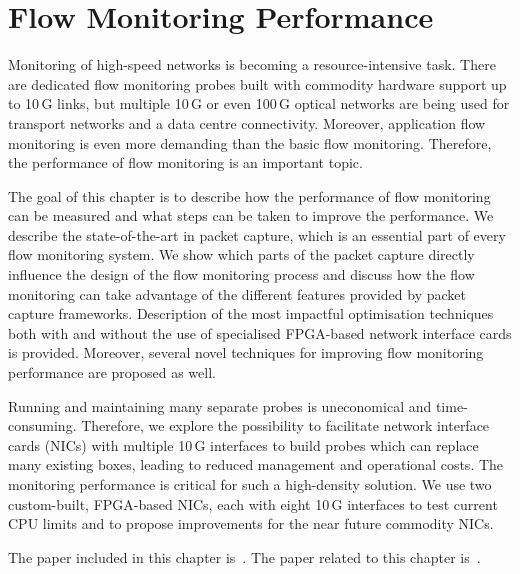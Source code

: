 \chapter{Flow Monitoring Performance}\label{chap:flow-monitoring-performance}

\begin{chapintro}

Monitoring of high-speed networks is becoming a resource-intensive task. There are dedicated flow monitoring probes built with commodity hardware support up to 10\,G links, but multiple 10\,G or even 100\,G optical networks are being used for transport networks and a data centre connectivity. Moreover, application flow monitoring is even more demanding than the basic flow monitoring. Therefore, the performance of flow monitoring is an important topic.

The goal of this chapter is to describe how the performance of flow monitoring can be measured and what steps can be taken to improve the performance. We describe the state-of-the-art in packet capture, which is an essential part of every flow monitoring system. We show which parts of the packet capture directly influence the design of the flow monitoring process and discuss how the flow monitoring can take advantage of the different features provided by packet capture frameworks. Description of the most impactful optimisation techniques both with and without the use of specialised FPGA-based network interface cards is provided. Moreover, several novel techniques for improving flow monitoring performance are proposed as well.

Running and maintaining many separate probes is uneconomical and time-consuming. Therefore, we explore the possibility to facilitate network interface cards (NICs) with multiple 10\,G interfaces to build probes which can replace many existing boxes, leading to reduced management and operational costs. The monitoring performance is critical for such a high-density solution. We use two custom-built, FPGA-based NICs, each with eight 10\,G interfaces to test current CPU limits and to propose improvements for the near future commodity NICs.

The paper included in this chapter is~\cite{Velan-2015-High}. %
The paper related to this chapter is~\cite{Pus-2015-Hardware}.


\end{chapintro}
